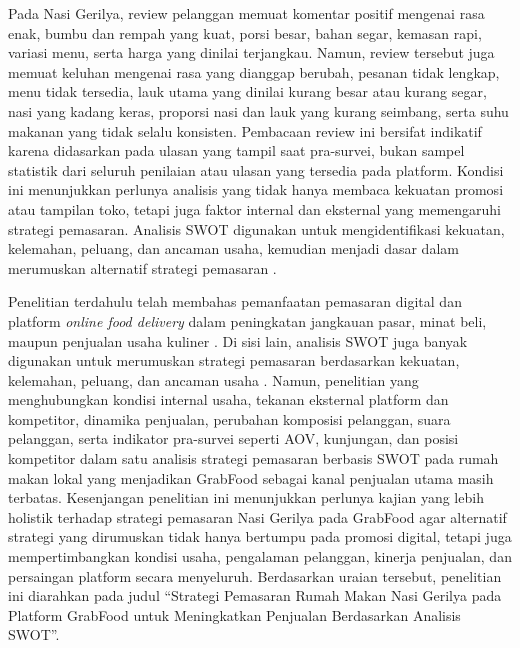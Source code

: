 Pada Nasi Gerilya, review pelanggan memuat komentar positif mengenai rasa enak, bumbu dan rempah yang kuat, porsi besar, bahan segar, kemasan rapi, variasi menu, serta harga yang dinilai terjangkau. Namun, review tersebut juga memuat keluhan mengenai rasa yang dianggap berubah, pesanan tidak lengkap, menu tidak tersedia, lauk utama yang dinilai kurang besar atau kurang segar, nasi yang kadang keras, proporsi nasi dan lauk yang kurang seimbang, serta suhu makanan yang tidak selalu konsisten. Pembacaan review ini bersifat indikatif karena didasarkan pada ulasan yang tampil saat pra-survei, bukan sampel statistik dari seluruh penilaian atau ulasan yang tersedia pada platform. Kondisi ini menunjukkan perlunya analisis yang tidak hanya membaca kekuatan promosi atau tampilan toko, tetapi juga faktor internal dan eksternal yang memengaruhi strategi pemasaran. Analisis SWOT digunakan untuk mengidentifikasi kekuatan, kelemahan, peluang, dan ancaman usaha, kemudian menjadi dasar dalam merumuskan alternatif strategi pemasaran \parencite{rangkuti2016analisisSWOT,david2023strategicmanagement}.

Penelitian terdahulu telah membahas pemanfaatan pemasaran digital dan platform \textit{online food delivery} dalam peningkatan jangkauan pasar, minat beli, maupun penjualan usaha kuliner \parencite{regina2025kuliner,suharjo2020bogorsnacks,ruhiyat2023minatbeli,khairani2022buahsayur}. Di sisi lain, analisis SWOT juga banyak digunakan untuk merumuskan strategi pemasaran berdasarkan kekuatan, kelemahan, peluang, dan ancaman usaha \parencite{rangkuti2016analisisSWOT,david2023strategicmanagement}. Namun, penelitian yang menghubungkan kondisi internal usaha, tekanan eksternal platform dan kompetitor, dinamika penjualan, perubahan komposisi pelanggan, suara pelanggan, serta indikator pra-survei seperti AOV, kunjungan, dan posisi kompetitor dalam satu analisis strategi pemasaran berbasis SWOT pada rumah makan lokal yang menjadikan GrabFood sebagai kanal penjualan utama masih terbatas. Kesenjangan penelitian ini menunjukkan perlunya kajian yang lebih holistik terhadap strategi pemasaran Nasi Gerilya pada GrabFood agar alternatif strategi yang dirumuskan tidak hanya bertumpu pada promosi digital, tetapi juga mempertimbangkan kondisi usaha, pengalaman pelanggan, kinerja penjualan, dan persaingan platform secara menyeluruh. Berdasarkan uraian tersebut, penelitian ini diarahkan pada judul ``Strategi Pemasaran Rumah Makan Nasi Gerilya pada Platform GrabFood untuk Meningkatkan Penjualan Berdasarkan Analisis SWOT''.

